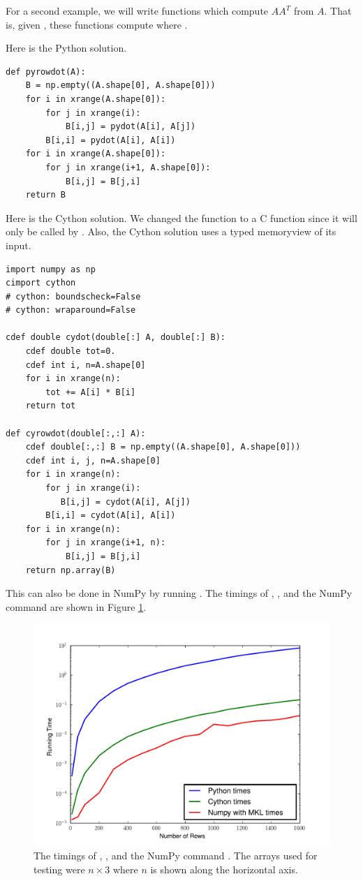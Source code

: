 For a second example, we will write functions which compute $AA^T$ from $A$.
That is, given , these functions compute  where
.

Here is the Python solution.
\begin{lstlisting}
def pyrowdot(A):
    B = np.empty((A.shape[0], A.shape[0]))
    for i in xrange(A.shape[0]):
        for j in xrange(i):
            B[i,j] = pydot(A[i], A[j])
        B[i,i] = pydot(A[i], A[i])
    for i in xrange(A.shape[0]):
        for j in xrange(i+1, A.shape[0]):
            B[i,j] = B[j,i]
    return B
\end{lstlisting}

Here is the Cython solution. 
We changed the function  to a C function since it will only be called by .
Also, the Cython solution uses a typed memoryview of its input.

\begin{lstlisting}
import numpy as np
cimport cython
# cython: boundscheck=False
# cython: wraparound=False

cdef double cydot(double[:] A, double[:] B):
    cdef double tot=0.
    cdef int i, n=A.shape[0]
    for i in xrange(n):
        tot += A[i] * B[i]
    return tot

def cyrowdot(double[:,:] A):
    cdef double[:,:] B = np.empty((A.shape[0], A.shape[0]))
    cdef int i, j, n=A.shape[0]
    for i in xrange(n):
        for j in xrange(i):
           B[i,j] = cydot(A[i], A[j])
        B[i,i] = cydot(A[i], A[i])
    for i in xrange(n):
        for j in xrange(i+1, n):
            B[i,j] = B[j,i]
    return np.array(B)
\end{lstlisting}

This can also be done in NumPy by running .
The timings of , , and the NumPy command  are shown in Figure \ref{cython:rowdot}.

\begin{figure}
\centering
\includegraphics[width=\textwidth]{rowdot.pdf}
\caption{The timings of , , and the NumPy command .
The arrays used for testing were $n\times 3$ where $n$ is shown along the horizontal axis.}
\label{cython:rowdot}
\end{figure}


